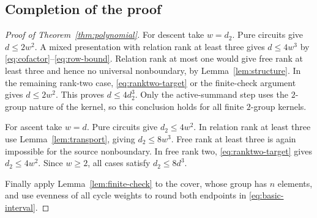 \subsection{Completion of the proof}
\begin{proof}[Proof of Theorem~\ref{thm:polynomial}]
For descent take $w=d_2$. Pure circuits give $d\le2w^2$. A mixed presentation with relation rank at least three gives $d\le4w^3$ by \eqref{eq:cofactor}--\eqref{eq:row-bound}. Relation rank at most one would give free rank at least three and hence no universal nonboundary, by Lemma~\ref{lem:structure}. In the remaining rank-two case, \eqref{eq:ranktwo-target} or the finite-check argument gives $d\le2w^2$. This proves $d\le4d_2^3$. Only the active-summand step uses the $2$-group nature of the kernel, so this conclusion holds for all finite $2$-group kernels.

For ascent take $w=d$. Pure circuits give $d_2\le4w^2$. In relation rank at least three use Lemma~\ref{lem:transport}, giving $d_2\le8w^3$. Free rank at least three is again impossible for the source nonboundary. In free rank two, \eqref{eq:ranktwo-target} gives $d_2\le4w^2$. Since $w\ge2$, all cases satisfy $d_2\le8d^3$.

Finally apply Lemma~\ref{lem:finite-check} to the cover, whose group has $n$ elements, and use evenness of all cycle weights to round both endpoints in \eqref{eq:basic-interval}.
\end{proof}
